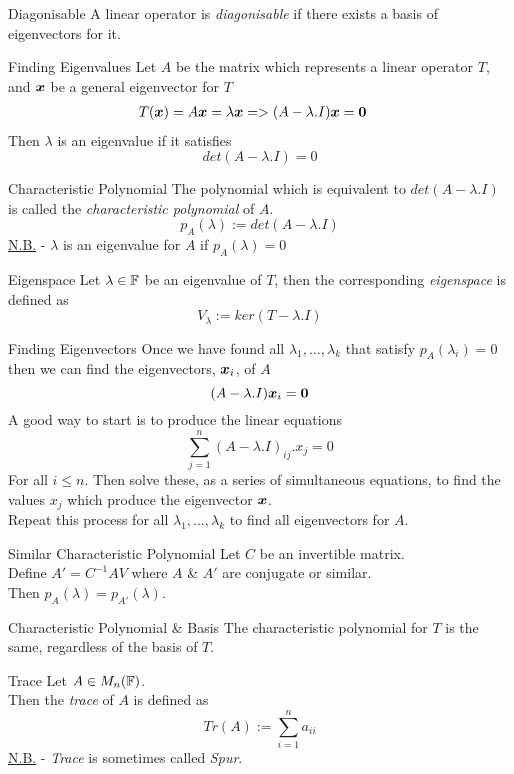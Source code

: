 \documentclass[11pt,a4paper]{article}
\begin{document}
\subtitle{Defintion 8.03 - }{Diagonisable}
A linear operator is \textit{diagonisable} if there exists a basis of eigenvectors for it.\\

\subtitle{Remark 8.04 - }{Finding Eigenvalues}
Let $A$ be the matrix which represents a linear operator $T$, and $\boldsymbol{x}$ be a general eigenvector for $T$
\begin{alignat*}{1}
  T(\boldsymbol{x}) = A\boldsymbol{x} &= \lambda\boldsymbol{x}
  => (A - \lambda.I)\boldsymbol{x} = \boldsymbol{0}
\end{alignat*}
Then $\lambda$ is an eigenvalue if it satisfies $$det(A - \lambda.I) = 0$$

\subtitle{Definition 8.05 - }{Characteristic Polynomial}
The polynomial which is equivalent to $det(A - \lambda.I)$ is called the \textit{characteristic polynomial} of $A$.
$$p_A(\lambda) := det(A - \lambda.I)$$
\underline{N.B.} - $\lambda$ is an eigenvalue for $A$ if $p_A(\lambda) = 0$\\

\subtitle{Definition 8.06 - }{Eigenspace}
Let $\lambda \in \mathbb{F}$ be an eigenvalue of $T$, then the corresponding \textit{eigenspace} is defined as
$$V_\lambda := ker(T - \lambda.I)$$

\subtitle{Remark 8.07 - }{Finding Eigenvectors}
Once we have found all $\lambda_1 , \dots , \lambda_k$ that satisfy $p_A(\lambda_i) = 0$ then we can find the eigenvectors, $\boldsymbol{x}_i$, of $A$
$$(A - \lambda.I)\boldsymbol{x}_i = \boldsymbol{0}$$
A good way to start is to produce the linear equations
$$\sum_{j=1}^{n} (A - \lambda.I)_{ij}.x_j = 0$$
For all $i \leq n$. Then solve these, as a series of simultaneous equations, to find the values $x_j$ which produce the eigenvector $\boldsymbol{x}$.\\
Repeat this process for all $\lambda_1 , \dots , \lambda_k$ to find all eigenvectors for $A$.\\

\subtitle{Theorem 8.08 - }{Similar Characteristic Polynomial}
Let $C$ be an invertible matrix.\\
Define $A' = C^{-1}AV$ where $A$ \& $A'$ are conjugate or similar.\\
Then $p_A(\lambda) = p_{A'}(\lambda)$.\\

\subtitle{Theorem 8.09 - }{Characteristic Polynomial \& Basis}
The characteristic polynomial for $T$ is the same, regardless of the basis of $T$.\\

\subtitle{Definition 8.10 - }{Trace}
Let $A \in M_n(\mathbb{F})$.\\
Then the \textit{trace} of $A$ is defined as
$$Tr(A) := \sum_{i=1}^{n}a_{ii}$$
\underline{N.B.} - \textit{Trace} is sometimes called \textit{Spur}.\\
\end{document}
